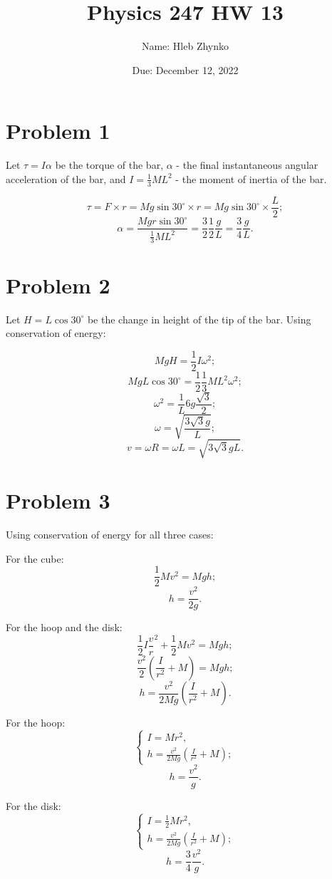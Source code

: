 \documentclass{article}
\title{Physics 247 HW 13}
\author{Name: Hleb Zhynko}
\date{Due: December 12, 2022}
\begin{document}
\maketitle

\section*{Problem 1}
Let $\tau = I\alpha$ be the torque of the bar, $\alpha$ - the final instantaneous angular acceleration of the bar, and $I = \frac{1}{3}ML^2$ - the moment of inertia of the bar.

\[
\tau = F \times r = Mg\sin{30^{\circ}} \times r = Mg\sin{30^{\circ}} \times \frac{L}{2};
\]
\[
\alpha = \frac{Mgr\sin{30^{\circ}}}{\frac{1}{3}ML^2} = \frac{3}{2}\frac{1}{2}\frac{g}{L} = \frac{3}{4}\frac{g}{L}.
\]

\section*{Problem 2}
Let $H = L\cos{30^{\circ}}$ be the change in height of the tip of the bar. Using conservation of energy:

\[
MgH = \frac{1}{2}I\omega^2;
\]
\[
MgL\cos{30^{\circ}} = \frac{1}{2}\frac{1}{3}ML^2\omega^2;
\]
\[
\omega^2 = \frac{1}{L}6g\frac{\sqrt{3}}{2};
\]
\[
\omega = \sqrt{\frac{3\sqrt{3}g}{L}};
\]
\[
v = \omega R = \omega L = \sqrt{3\sqrt{3}gL}.
\]

\section*{Problem 3}
Using conservation of energy for all three cases:

For the cube:
\[
\frac{1}{2}Mv^2 = Mgh;
\]
\[
h = \frac{v^2}{2g}.
\]

For the hoop and the disk:
\[
\frac{1}{2}I\frac{v}{r}^2 + \frac{1}{2}Mv^2 = Mgh;
\]
\[
\frac{v^2}{2}\left(\frac{I}{r^2} + M\right) = Mgh;
\]
\[
h = \frac{v^2}{2Mg}\left(\frac{I}{r^2} + M\right).
\]

For the hoop:
\[
\begin{cases}
I = Mr^2,\\
h = \frac{v^2}{2Mg}\left(\frac{I}{r^2} + M\right);
\end{cases}
\]
\[
h = \frac{v^2}{g}.
\]

For the disk:
\[
\begin{cases}
I = \frac{1}{2}Mr^2,\\
h = \frac{v^2}{2Mg}\left(\frac{I}{r^2} + M\right);
\end{cases}
\]
\[
h = \frac{3}{4}\frac{v^2}{g}.
\]
\end{document}

